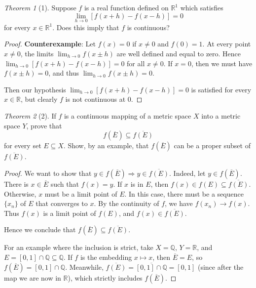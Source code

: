 \documentclass[12pt]{article}
\theoremstyle{remark}
\theoremstyle{named}
\newtheorem*{theorem}{Theorem}
\renewcommand{\implies}{\Rightarrow}
\begin{document}
\begin{theorem}[1]
    Suppose \(f\) is a real function defined on \(\mathbb R^1\) which satisfies 
    \[\lim_{h \to 0}[f(x + h) - f(x - h)] = 0\]
    for every \(x \in \mathbb R^1\). Does this imply that \(f\) is continuous?
\end{theorem}

\begin{proof}
    \textbf{Counterexample}: Let \(f(x) = 0\) if \(x \neq 0\) and \(f(0) = 1\). At every point \(x \neq 0\), the limits \(\lim_{h \to 0} f(x \pm h)\) are well defined and equal to zero. Hence \(\lim_{h \to 0}[f(x + h) - f(x - h)] = 0\) for all \(x \neq 0\). If \(x = 0\), then we must have \(f(x \pm h) = 0\), and thus \(\lim_{h \to 0} f(x \pm h) = 0\). 

    Then our hypothesis \(\lim_{h \to 0}[f(x + h) - f(x - h)] = 0\) is satisfied for every \(x \in \mathbb R\), but clearly \(f\) is not continuous at 0. 
\end{proof}

\begin{theorem}[2]
    If \(f\) is a continuous mapping of a metric space \(X\) into a metric space \(Y\), prove that 
    \[f(\overline{E}) \subseteq \overline{f(E)}\]
    for every set \(E \subseteq X\). Show, by an example, that \(f(\overline{E})\) can be a proper subset of \(\overline{f(E)}\).
\end{theorem}

\begin{proof}
    We want to show that \(y \in f(\overline{E}) \implies y \in \overline{f(E)}\). Indeed, let \(y \in f(\overline{E})\). There is \(x \in \overline{E}\) such that \(f(x) = y\). If \(x\) is in \(E\), then \(f(x) \in f(E) \subseteq \overline{f(E)}\). Otherwise, \(x\) must be a limit point of \(E\). 
    In this case, there must be a sequence \(\{x_n\}\) of \(E\) that converges to \(x\). By the continuity of \(f\), we have \(f(x_n) \to f(x)\). Thus \(f(x)\) is a limit point of \(f(E)\), and \(f(x) \in \overline{f(E)}\). 

    Hence we conclude that \(f(\overline{E}) \subseteq \overline{f(E)}\).

    For an example where the inclusion is strict, take \(X = \mathbb Q\), \(Y = \mathbb R\), and \(E = [0, 1] \cap \mathbb Q \subseteq \mathbb Q\). If \(f\) is the embedding \(x \mapsto x\),  then \(\overline{E} = E\), so \(f(\overline{E}) = [0, 1] \cap \mathbb Q\). Meanwhile, \(\overline{f(E)} = \overline{[0, 1] \cap \mathbb Q} = [0, 1]\) (since after the map we are now in \(\mathbb R\)), which strictly includes \(f(\overline{E})\). 
\end{proof}
\end{document}
